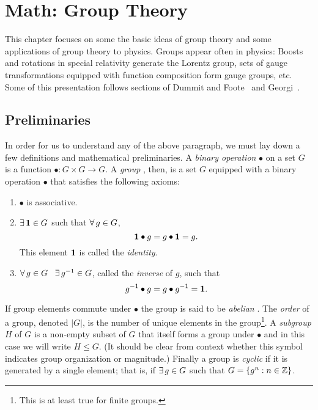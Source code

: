 \chapter{Math: Group Theory}\label{ch:group}
This chapter focuses on some the basic ideas of group theory and some 
applications of group theory to physics. Groups appear often in physics:
Boosts and rotations in special relativity 
generate the Lorentz group, sets of gauge transformations equipped with 
function composition form gauge groups, etc. Some of this presentation
follows sections of Dummit and Foote~\cite{dummit_abstract_2004} and 
Georgi~\cite{georgi_lie_1999}.


\section{Preliminaries}\label{sec:gpprelim}
In order for us to understand any of the above paragraph, we must lay down a
few definitions and mathematical preliminaries.
A {\it binary operation}  $\bullet$ on a set 
$G$ is a function $\bullet : G\times G\to G$. A {\it group} , 
then, is a set $G$ equipped with a binary operation $\bullet$ that satisfies 
the following axioms:
  \begin{enumerate}
    \item $\bullet$ is associative.
    \item $\operatorname{\exists} {\mathbf 1} \in G$ such that $\operatorname{\forall} g \in G$, 
          \begin{equation}
            {\mathbf 1}\bullet g=g\bullet {\mathbf 1}=g. 
          \end{equation} This element ${\mathbf 1}$ is called the {\it identity}.
    \item $\operatorname{\forall} g \in G\ \ \operatorname{\exists} g^{-1} \in G$, called the 
          {\it inverse}  of $g$, such that
          \begin{equation}
            g^{-1}\bullet g=g\bullet g^{-1}={\mathbf 1}.
          \end{equation}
  \end{enumerate}
If group elements commute under $\bullet$ the group is said to be 
{\it abelian} . The {\it order}  of a group, 
denoted $|G|$, is the number of unique elements in the group\footnote{This
is at least true for finite groups.}. A {\it subgroup} 
$H$ of $G$ is a non-empty subset of $G$ that itself forms a group under 
$\bullet$ and in this case we will write $H\leq G$. 
(It should be clear from context whether this symbol indicates group 
organization or magnitude.) Finally a group is {\it cyclic} 
if it is generated by a single element; that is, if $\operatorname{\exists} g\in G$ such that 
$G=\{g^{n}:  n\in\mathbb{Z}\}$.

